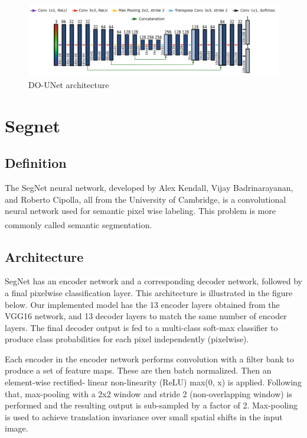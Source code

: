 \begin{figure}[H]
\centering
  \vspace{-0.1in}
    \centerline{\includegraphics[width = \linewidth]{../images/DO-UNET.png}}
    \caption{DO-UNet architecture}
    \label{fig:DO-UNET}
\end{figure}

\section{Segnet}
\subsection{Definition}
\hspace{\parindent}
The SegNet neural network, developed by Alex Kendall, Vijay Badrinarayanan, and Roberto Cipolla, all from the University of Cambridge, is a convolutional neural network used for semantic pixel wise labeling. This problem is more commonly called semantic segmentation. \textsuperscript{\cite{badrinarayanan2017segnet}}

\subsection{Architecture}
\hspace{\parindent}
SegNet has an encoder network and a corresponding decoder network, followed by a final pixelwise classification layer. This architecture is illustrated in the figure below.
Our implemented model has the 13 encoder layers obtained from the VGG16 network, and 13 decoder layers to match the same number of encoder layers. The final decoder output is fed to a multi-class soft-max classifier to produce class probabilities for each pixel independently (pixelwise).

Each encoder in the encoder network performs convolution with a filter bank to produce a set of feature maps. These are then batch normalized. Then an element-wise rectified- linear non-linearity (ReLU) max(0, x) is applied. Following that, max-pooling with a 2x2 window and stride 2 (non-overlapping window) is performed and the resulting output is sub-sampled by a factor of 2. Max-pooling is used to achieve translation invariance over small spatial shifts in the input image.

